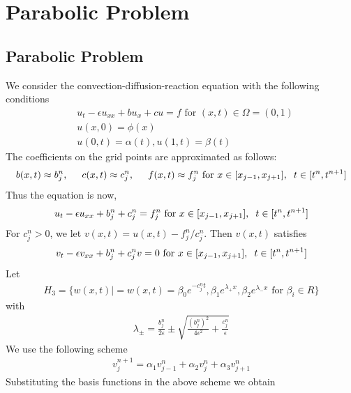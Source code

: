 
\chapter{Parabolic Problem} %

\label{Chapter2} %



\section{Parabolic Problem}
We consider the convection-diffusion-reaction equation with the following conditions
\begin{align}
 & u_{t}-\epsilon u_{xx} + bu_{x} + cu = f \text{ for } (x,t) \in \Omega=(0,1)\\
 & u(x,0) = \phi(x)\\
 & u(0,t) = \alpha(t), u(1,t) = \beta(t)
\end{align}
The coefficients on the grid points are approximated as follows:
\begin{align*}
 b(x,t) \approx b_{j}^{n}, \hspace{5mm} c(x,t) \approx c_{j}^{n}, \hspace{5mm}f(x,t) \approx f_{j}^{n} \text{ for } x \in [x_{j-1},x_{j+1}],\hspace{2mm} t \in [t^{n},t^{n+1}]
\end{align*}
Thus the equation is now,
\begin{align*}
 u_t -\epsilon u_{xx} + b_{j}^{n} + c_{j}^{n} = f_{j}^{n} \text{ for } x \in [x_{j-1},x_{j+1}],\hspace{2mm} t \in [t^{n},t^{n+1}]
\end{align*}
For $c_{j}^{n}>0$, we let $v(x,t) = u(x,t)-f_{j}^{n}/c_{j}^{n}$. Then $v(x,t)$ satisfies
\begin{align*}
 v_t-\epsilon v_{xx} + b_{j}^{n} + c_{j}^{n}v = 0 \text{ for } x \in [x_{j-1},x_{j+1}],\hspace{2mm} t \in [t^{n},t^{n+1}]
\end{align*}
Let
\begin{align*}
 H_{3} = \{ w(x,t) | = w(x,t) = \beta_{0}e^{-c_{j}^{n}t}, \beta_{1}e^{\lambda_{+}x},\beta_{2}e^{\lambda_{-}x} \text{ for } \beta_{i} \in R     \}
\end{align*}
with
\begin{align*}
 \lambda_{\pm} = \frac{b_{j}^{n}}{2\epsilon} \pm \sqrt{\frac{(b_{j}^{n})^2}{4 \epsilon^2}+\frac{c_{j}^{n}}{\epsilon}}
\end{align*}
We use the following scheme
\begin{align*}
 v_{j}^{n+1} = \alpha_{1}v_{j-1}^{n}+\alpha_{2}v_{j}^{n}+\alpha_{3}v_{j+1}^{n}
\end{align*}
Substituting the basis functions in the above scheme we obtain

